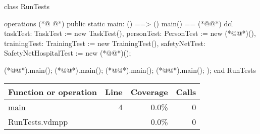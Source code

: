 \begin{vdmpp}[breaklines=true]
class RunTests

operations
(*@
\label{main:4}
@*)
 public static main: () ==> ()
   main() == (*@\vdmnotcovered{(}@*)
    dcl taskTest: TaskTest := new TaskTest(), personTest: PersonTest := new (*@@*)(), 
     trainingTest: TrainingTest := new TrainingTest(), safetyNetTest: SafetyNetHospitalTest := new (*@@*)();
    
    (*@@*).main();
    (*@@*).main();    
    (*@@*).main();
    (*@@*).main();
   );
end RunTests
\end{vdmpp}
\bigskip
\begin{longtable}{|l|r|r|r|}
\hline
Function or operation & Line & Coverage & Calls \\
\hline
\hline
\hyperref[main:4]{main} & 4&0.0\% & 0 \\
\hline
\hline
RunTests.vdmpp & & 0.0\% & 0 \\
\hline
\end{longtable}

